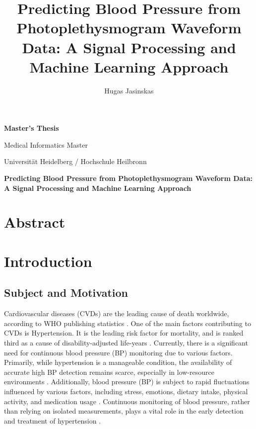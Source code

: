 \documentclass[10pt, bibliography=totoc]{scrartcl}
\title{Predicting Blood Pressure from Photoplethysmogram Waveform Data: A Signal Processing and
Machine Learning Approach}
\author{Hugas Jasinskas}
\begin{document}
\begin{titlepage}
\begin{center}
        \vspace*{1cm}
            
        \Huge
        \textbf{Master's Thesis}
            
        \vspace{0.5cm}
        \Large
        Medical Informatics Master
        
        \vspace{0.5cm}
        \Large
        Universität Heidelberg / Hochschule Heilbronn
        
        \hrulefill
            
        \vspace{1.5cm}
        
        \Huge
        \textbf{Predicting Blood Pressure from Photoplethysmogram Waveform Data: A Signal Processing and
Machine Learning Approach}
        
    \end{center}
    
\end{titlepage}

\newpage

\tableofcontents

\newpage

\section{Abstract}
\section{Introduction}
\subsection{Subject and Motivation}

Cardiovascular diseases (CVDs) are the leading cause of death worldwide, according to WHO publishing statistics \cite{organizationWorldHealthStatistics2023}. One of the main factors contributing to CVDs is Hypertension.
It is the leading risk factor for mortality, and is ranked third as a cause of disability-adjusted life-years \cite{ezzatiSelectedMajorRisk2002}.
Currently, there is a significant need for continuous blood pressure (BP) monitoring due to various factors. Primarily, while hypertension is a manageable condition, the availability of accurate high BP detection remains scarce, especially in low-resource environments \cite{burtPrevalenceHypertensionUS1995}. 
Additionally, blood pressure (BP) is subject to rapid fluctuations influenced by various factors, including stress, emotions, dietary intake, physical activity, and medication usage \cite{poonCufflessNoninvasiveMeasurements2005}.
Continuous monitoring of blood pressure, rather than relying on isolated measurements, plays a vital role in the early detection and treatment of hypertension  \cite{el-hajjDeepLearningModels2021}.
\end{document}
